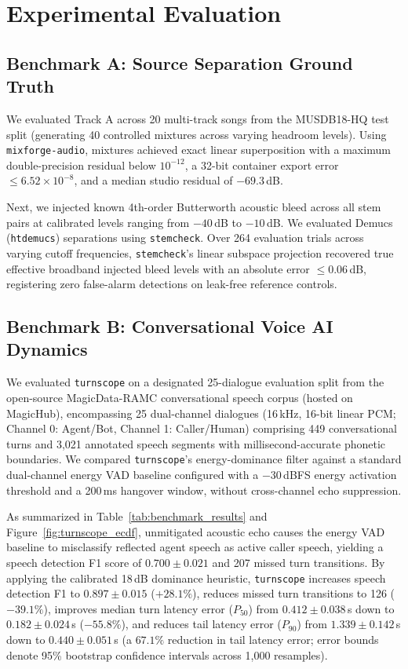 \documentclass[10pt,journal,compsoc]{IEEEtran}
\begin{document}
\newpage
\section{Experimental Evaluation}

\subsection{Benchmark A: Source Separation Ground Truth}
We evaluated Track A across 20 multi-track songs from the MUSDB18-HQ test split (generating 40 controlled mixtures across varying headroom levels). Using \texttt{mixforge-audio}, mixtures achieved exact linear superposition with a maximum double-precision residual below $10^{-12}$, a 32-bit container export error $\le 6.52 \times 10^{-8}$, and a median studio residual of $-69.3$\,dB.

Next, we injected known 4th-order Butterworth acoustic bleed across all stem pairs at calibrated levels ranging from $-40$\,dB to $-10$\,dB. We evaluated Demucs (\texttt{htdemucs}) separations using \texttt{stemcheck}. Over 264 evaluation trials across varying cutoff frequencies, \texttt{stemcheck}'s linear subspace projection recovered true effective broadband injected bleed levels with an absolute error $\le 0.06$\,dB, registering zero false-alarm detections on leak-free reference controls.

\subsection{Benchmark B: Conversational Voice AI Dynamics}
We evaluated \texttt{turnscope} on a designated 25-dialogue evaluation split from the open-source MagicData-RAMC conversational speech corpus \cite{magichub2021} (hosted on MagicHub), encompassing 25 dual-channel dialogues (16\,kHz, 16-bit linear PCM; Channel 0: Agent/Bot, Channel 1: Caller/Human) comprising 449 conversational turns and 3,021 annotated speech segments with millisecond-accurate phonetic boundaries. We compared \texttt{turnscope}'s energy-dominance filter against a standard dual-channel energy VAD baseline configured with a $-30$\,dBFS energy activation threshold and a 200\,ms hangover window, without cross-channel echo suppression.

As summarized in Table~\ref{tab:benchmark_results} and Figure~\ref{fig:turnscope_ecdf}, unmitigated acoustic echo causes the energy VAD baseline to misclassify reflected agent speech as active caller speech, yielding a speech detection F1 score of $0.700 \pm 0.021$ and 207 missed turn transitions. By applying the calibrated 18\,dB dominance heuristic, \texttt{turnscope} increases speech detection F1 to $0.897 \pm 0.015$ ($+28.1\%$), reduces missed turn transitions to 126 ($-39.1\%$), improves median turn latency error ($P_{50}$) from $0.412 \pm 0.038$\,s down to $0.182 \pm 0.024$\,s ($-55.8\%$), and reduces tail latency error ($P_{90}$) from $1.339 \pm 0.142$\,s down to $0.440 \pm 0.051$\,s (a $67.1\%$ reduction in tail latency error; error bounds denote 95\% bootstrap confidence intervals across 1,000 resamples).
\end{document}
